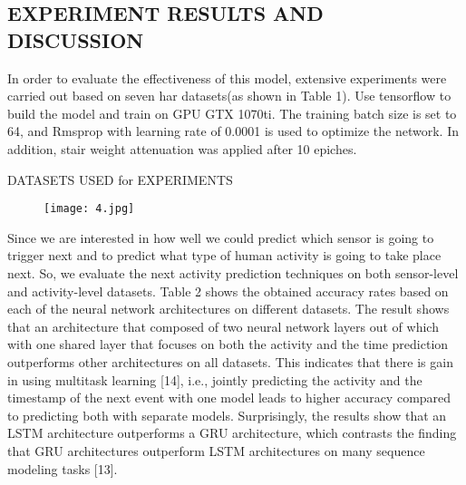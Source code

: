 \documentclass{article}
\begin{document}
\subsection{EXPERIMENT RESULTS AND DISCUSSION}
In order to evaluate the effectiveness of this model, extensive experiments were carried out based on seven har datasets(as shown in Table 1). Use tensorflow to build the model and train on GPU GTX 1070ti. The training batch size is set to 64, and Rmsprop with learning rate of 0.0001 is used to optimize the network. In addition, stair weight attenuation was applied after 10 epiches.
\begin{table}[htbp]
    \centering
    \caption{DATASETS USED for EXPERIMENTS}
    \label{tab:my_label}
\end{table}
\begin{figure}[h]
    \centering
    \texttt{[image: 4.jpg]}
    \label{fig:my_label}
\end{figure}
 Since we are interested in how well we could predict which sensor is going to trigger next and to predict what type of human activity is going to take place next. So, we evaluate the next activity prediction techniques on both sensor-level and activity-level datasets.
Table 2 shows the obtained accuracy rates based on each of the neural network architectures on different datasets. The result shows that an architecture that composed of two neural network layers out of which with one shared layer that focuses on both the activity and the time prediction outperforms other architectures on all datasets. This indicates that there is gain in using multitask learning [14], i.e., jointly predicting the activity and the timestamp of the next event with one model leads to higher accuracy compared to predicting both with separate models. Surprisingly, the results show that an LSTM architecture outperforms a GRU architecture, which contrasts the finding that GRU architectures outperform LSTM architectures on many sequence modeling tasks [13].
\end{document}
